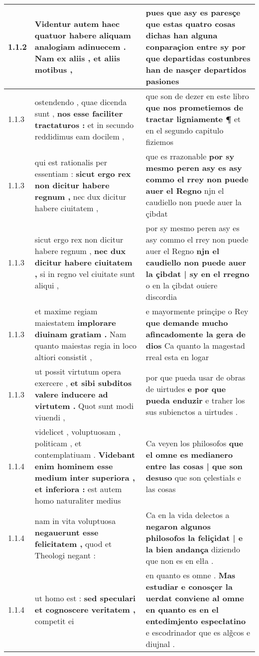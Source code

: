\begin{tabular}{|p{1cm}|p{6.5cm}|p{6.5cm}|}
1.1.2 & Videntur autem haec quatuor \textbf{ habere aliquam analogiam adinuecem . } Nam ex aliis , et aliis motibus , & pues que asy es paresçe \textbf{ que estas quatro cosas dichas han alguna conparaçion entre sy } por que departidas costunbres han de nasçer departidos pasiones \\\hline
1.1.3 & ostendendo , quae dicenda sunt , \textbf{ nos esse faciliter tractaturos : } et in secundo reddidimus eam docilem , & que son de dezer en este libro \textbf{ que nos prometiemos de tractar ligniamente ¶ } et en el segundo capitulo fiziemos \\\hline
1.1.3 & qui est rationalis per essentiam : \textbf{ sicut ergo rex non dicitur habere regnum , } nec dux dicitur habere ciuitatem , & que es rrazonable \textbf{ por sy mesmo peren asy es asy commo el rrey non puede auer el Regno } njn el caudiello non puede auer la çibdat \\\hline
1.1.3 & sicut ergo rex non dicitur habere regnum , \textbf{ nec dux dicitur habere ciuitatem , } si in regno vel ciuitate sunt aliqui , & por sy mesmo peren asy es asy commo el rrey non puede auer el Regno \textbf{ njn el caudiello non puede auer la çibdat | sy en el rregno } o en la çibdat ouiere discordia \\\hline
1.1.3 & et maxime regiam maiestatem \textbf{ implorare diuinam gratiam . } Nam quanto maiestas regia in loco altiori consistit , & e mayormente prinçipe o Rey \textbf{ que demande mucho afincadomente la gera de dios } Ca quanto la magestad rreal esta en logar \\\hline
1.1.3 & ut possit virtutum opera exercere , \textbf{ et sibi subditos valere inducere ad virtutem . } Quot sunt modi viuendi , & por que pueda usar de obras de uirtudes \textbf{ e por que pueda enduzir } e traher los sus subienctos a uirtudes . \\\hline
1.1.4 & videlicet , voluptuosam , politicam , et contemplatiuam . \textbf{ Videbant enim hominem esse medium inter superiora , et inferiora : } est autem homo naturaliter medius & Ca veyen los philosofos \textbf{ que el omne es medianero entre las cosas | que son desuso } que son çelestiałs e las cosas \\\hline
1.1.4 & nam in vita voluptuosa \textbf{ negauerunt esse felicitatem , } quod et Theologi negant : & Ca en la vida delectos a \textbf{ negaron algunos philosofos la feliçidat | e la bien andança } diziendo que non es en elła . \\\hline
1.1.4 & ut homo est : \textbf{ sed speculari et cognoscere veritatem , } competit ei & en quanto es omne . \textbf{ Mas estudiar e conosçer la uerdat conviene al omne en quanto es en el entedimjento especłatino } e escodrinador que es alg̃cos e diujnal . \\\hline

\end{tabular}

